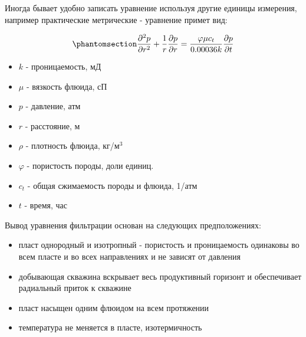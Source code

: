 \documentclass[
  russian,
  letterpaper,
  DIV=11,
  numbers=noendperiod,
  oneside]{scrartcl}
\providecommand{\tightlist}{%
  \setlength{\itemsep}{0pt}\setlength{\parskip}{0pt}}
\begin{document}
Иногда бывает удобно записать уравнение используя другие единицы
измерения, например практические метрические - уравнение примет вид:

\begin{tcolorbox}[enhanced jigsaw, opacityback=0, title=\textcolor{quarto-callout-tip-color}{\faLightbulb}\hspace{0.5em}{Уравнение фильтрации в практических метрических единицах измерений}, breakable, rightrule=.15mm, toptitle=1mm, left=2mm, bottomtitle=1mm, opacitybacktitle=0.6, colframe=quarto-callout-tip-color-frame, coltitle=black, titlerule=0mm, leftrule=.75mm, bottomrule=.15mm, arc=.35mm, colback=white, colbacktitle=quarto-callout-tip-color!10!white, toprule=.15mm]

\begin{equation}\phantomsection\label{eq-diff_eq_2}{ 
    \frac{\partial ^2 p }{\partial r^2} + \frac{1}{r} \frac{\partial p}{\partial r} = \frac{\varphi \mu c_t}{0.00036 k} \frac{\partial p}{\partial t} 
}\end{equation}

\begin{itemize}
\tightlist
\item
  \(k\) - проницаемость, мД
\item
  \(\mu\) - вязкость флюида, сП
\item
  \(p\) - давление, атм
\item
  \(r\) - расстояние, м
\item
  \(\rho\) - плотность флюида, кг/м\(^3\)
\item
  \(\varphi\) - пористость породы, доли единиц.
\item
  \(c_t\) - общая сжимаемость породы и флюида, 1/атм
\item
  \(t\) - время, час
\end{itemize}

\end{tcolorbox}

Вывод уравнения фильтрации основан на следующих предположениях:

\begin{itemize}
\tightlist
\item
  пласт однородный и изотропный - пористость и проницаемость одинаковы
  во всем пласте и во всех направлениях и не зависят от давления
\item
  добывающая скважина вскрывает весь продуктивный горизонт и
  обеспечивает радиальный приток к скважине
\item
  пласт насыщен одним флюидом на всем протяжении
\item
  температура не меняется в пласте, изотермичность
\end{itemize}
\end{document}
